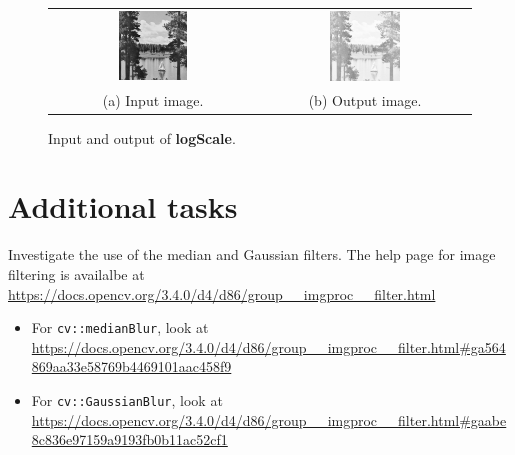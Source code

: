 \documentclass[english,a4paper,12pt,oneside]{article}
\begin{document}
        \begin {figure}[htb]
	\centering
	\begin{tabular}{cc}
		\includegraphics[width=0.35\textwidth]{lake}&
		\includegraphics[width=0.35\textwidth]{lake_log}\\
		(a) Input image. & (b) Output image.
	\end{tabular}
      \caption{\label{fig:logFilter}Input and output of \textbf{logScale}.}
    \end {figure}

    
\section{Additional tasks}

Investigate the use of the median and Gaussian filters. 
The help page for image filtering is availalbe at \url{https://docs.opencv.org/3.4.0/d4/d86/group__imgproc__filter.html}

\begin{itemize}
	\item For \verb|cv::medianBlur|, look at\\ \url{https://docs.opencv.org/3.4.0/d4/d86/group__imgproc__filter.html#ga564869aa33e58769b4469101aac458f9} 
	\item For \verb|cv::GaussianBlur|, look at \url{https://docs.opencv.org/3.4.0/d4/d86/group__imgproc__filter.html#gaabe8c836e97159a9193fb0b11ac52cf1}
\end{itemize}


\end{document}
